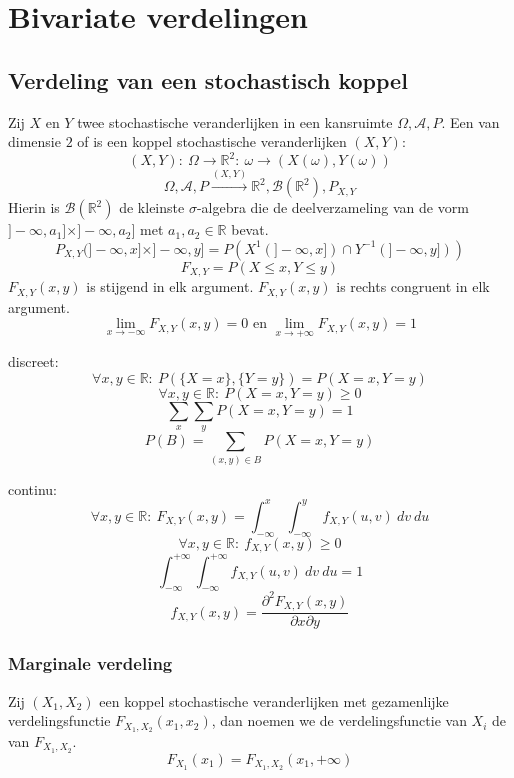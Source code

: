 \documentclass[main.tex]{subfiles}
\begin{document}
\chapter{Bivariate verdelingen}
\label{cha:bivar-verd}

\section{Verdeling van een stochastisch koppel}
\label{sec:verdeling-van-een}

\begin{de}
  Zij $X$ en $Y$ twee stochastische veranderlijken in een kansruimte $\Omega,\mathcal{A},P$.
  Een  van dimensie $2$ of  is een koppel stochastische veranderlijken $(X,Y)$:
  \[ (X,Y):\ \Omega \rightarrow \mathbb{R}^{2}:\ \omega \rightarrow (X(\omega),Y(\omega)) \]
  \[ \Omega,\mathcal{A},P \overset{(X,Y)}{\rightarrow} \mathbb{R}^{2},\mathcal{B}(\mathbb{R}^{2}), P_{X,Y} \]
  Hierin is $\mathcal{B}(\mathbb{R}^{2})$ de kleinste $\sigma$-algebra die de deelverzameling van de vorm $]-\infty,a_{1}]\times]-\infty,a_{2}]$ met $a_{1},a_{2}\in\mathbb{R}$ bevat.
  \[ P_{X,Y}(]-\infty,x]\times]-\infty,y] = P(X^{1}(]-\infty,x])\cap Y^{-1}(]-\infty,y])) \]
  \[ F_{X,Y} = P(X \le x, Y\le y) \]
  $F_{X,Y}(x,y)$ is stijgend in elk argument.
  $F_{X,Y}(x,y)$ is rechts congruent in elk argument.
  \[ \lim_{x\rightarrow -\infty} F_{X,Y}(x,y) = 0 \text{ en } \lim_{x\rightarrow +\infty} F_{X,Y}(x,y) = 1 \]
\end{de}

discreet:
\[ \forall x,y \in \mathbb{R}:\ P(\{X=x\},\{Y=y\}) = P(X=x,Y=y) \]
\[ \forall x,y \in \mathbb{R}:\ P(X=x,Y=y) \ge 0 \]
\[ \sum_{x}\sum_{y}P(X=x,Y=y) = 1 \]
\[ P(B) = \sum_{(x,y)\in B}P(X=x,Y=y) \]

continu:
\[ \forall x,y \in \mathbb{R}:\ F_{X,Y}(x,y) = \int_{-\infty}^{x}\int_{-\infty}^{y}f_{X,Y}(u,v)\ dv\ du \]
\[ \forall x,y \in \mathbb{R}:\ f_{X,Y}(x,y) \ge 0 \]
\[ \int_{-\infty}^{+\infty}\int_{-\infty}^{+\infty}f_{X,Y}(u,v)\ dv\ du = 1 \]
\[ f_{X,Y}(x,y) = \frac{\partial^{2}F_{X,Y}(x,y)}{\partial x \partial y} \]

\subsection{Marginale verdeling}
\label{sec:marginale-verdeling}

\begin{de}
  Zij $(X_{1},X_{2})$ een koppel stochastische veranderlijken met gezamenlijke verdelingsfunctie $F_{X_{1},X_{2}}(x_{1},x_{2})$, dan noemen we de verdelingsfunctie van $X_{i}$ de  van $F_{X_{1},X_{2}}$.
  \[ F_{X_{1}}(x_{1}) = F_{X_{1},X_{2}}(x_{1},+\infty) \]
\end{de}
\end{document}

